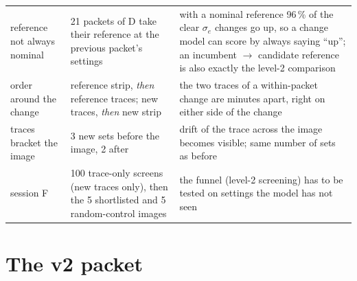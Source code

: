 \documentclass[11pt]{article}
\begin{document}
\begin{longtable}{p{3.2cm}p{5.3cm}p{6.7cm}}
reference not always nominal & 21 packets of D take their reference at the previous packet's settings & with a nominal
  reference 96\,\% of the clear $\sigma_e$ changes go up, so a change model can score by always saying ``up''; an
  incumbent $\to$ candidate reference is also exactly the level-2 comparison\\
order around the change & reference strip, \emph{then} reference traces; new traces, \emph{then} new strip & the two traces
  of a within-packet change are minutes apart, right on either side of the change\\
traces bracket the image & 3 new sets before the image, 2 after & drift of the trace across the image becomes visible;
  same number of sets as before\\
session F & 100 trace-only screens (new traces only), then the 5 shortlisted and 5 random-control images & the funnel (level-2
  screening) has to be tested on settings the model has not seen\\\bottomrule
\end{longtable}

\section{The v2 packet}
\end{document}

